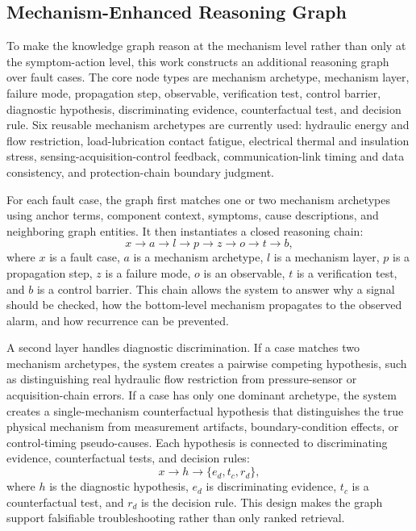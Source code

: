 \documentclass[lettersize,journal]{IEEEtran}
\begin{document}
\subsection{Mechanism-Enhanced Reasoning Graph}
To make the knowledge graph reason at the mechanism level rather than only at the symptom-action level, this work constructs an additional reasoning graph over fault cases. The core node types are mechanism archetype, mechanism layer, failure mode, propagation step, observable, verification test, control barrier, diagnostic hypothesis, discriminating evidence, counterfactual test, and decision rule. Six reusable mechanism archetypes are currently used: hydraulic energy and flow restriction, load-lubrication contact fatigue, electrical thermal and insulation stress, sensing-acquisition-control feedback, communication-link timing and data consistency, and protection-chain boundary judgment.

For each fault case, the graph first matches one or two mechanism archetypes using anchor terms, component context, symptoms, cause descriptions, and neighboring graph entities. It then instantiates a closed reasoning chain:
\begin{equation}
x \rightarrow a \rightarrow l \rightarrow p \rightarrow z \rightarrow o \rightarrow t \rightarrow b,
\end{equation}
where $x$ is a fault case, $a$ is a mechanism archetype, $l$ is a mechanism layer, $p$ is a propagation step, $z$ is a failure mode, $o$ is an observable, $t$ is a verification test, and $b$ is a control barrier. This chain allows the system to answer why a signal should be checked, how the bottom-level mechanism propagates to the observed alarm, and how recurrence can be prevented.

A second layer handles diagnostic discrimination. If a case matches two mechanism archetypes, the system creates a pairwise competing hypothesis, such as distinguishing real hydraulic flow restriction from pressure-sensor or acquisition-chain errors. If a case has only one dominant archetype, the system creates a single-mechanism counterfactual hypothesis that distinguishes the true physical mechanism from measurement artifacts, boundary-condition effects, or control-timing pseudo-causes. Each hypothesis is connected to discriminating evidence, counterfactual tests, and decision rules:
\begin{equation}
x \rightarrow h \rightarrow \{e_d,t_c,r_d\},
\end{equation}
where $h$ is the diagnostic hypothesis, $e_d$ is discriminating evidence, $t_c$ is a counterfactual test, and $r_d$ is the decision rule. This design makes the graph support falsifiable troubleshooting rather than only ranked retrieval.
\end{document}
